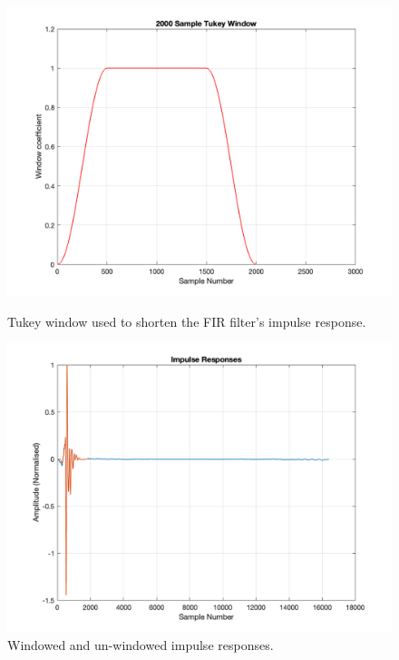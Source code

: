 \documentclass{report}
\begin{document}
            \begin{figure}[H]
                \centering
                \begin{minipage}{.49\textwidth}
                    \includegraphics[width=\linewidth]{figs/tukeyWin.png}
                    \caption{Tukey window used to shorten the FIR filter's impulse response.}
                    \label{tukeyWin}
                \end{minipage}
                \begin{minipage}{.49\textwidth}
                    \includegraphics[width=\linewidth]{figs/tukeyImpulse.png}
                    \caption{Windowed and un-windowed impulse responses.}
                    \label{tukeyImpulse}
                \end{minipage}
            \end{figure}
\end{document}
